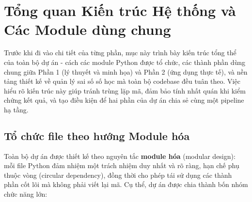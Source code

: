 ﻿%
\section{Tổng quan Kiến trúc Hệ thống và Các Module dùng chung}

Trước khi đi vào chi tiết của từng phần, mục này trình bày kiến trúc tổng thể của toàn bộ dự án - cách các module Python được tổ chức, các thành phần dùng chung giữa Phần 1 (lý thuyết và minh họa) và Phần 2 (ứng dụng thực tế), và nền tảng thiết kế về quản lý sai số số học mà toàn bộ codebase đều tuân theo. Việc hiểu rõ kiến trúc này giúp tránh trùng lặp mã, đảm bảo tính nhất quán khi kiểm chứng kết quả, và tạo điều kiện để hai phần của dự án chia sẻ cùng một pipeline hạ tầng.


\subsection{Tổ chức file theo hướng Module hóa}

Toàn bộ dự án được thiết kế theo nguyên tắc \textbf{module hóa} (modular design): mỗi file Python đảm nhiệm một trách nhiệm duy nhất và rõ ràng, hạn chế phụ thuộc vòng (circular dependency), đồng thời cho phép tái sử dụng các thành phần cốt lõi mà không phải viết lại mã. Cụ thể, dự án được chia thành bốn nhóm chức năng lớn:

